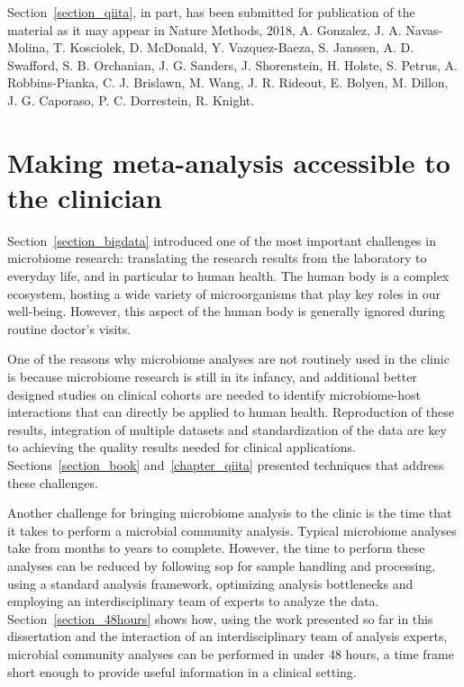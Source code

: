 \documentclass[12pt,chapterheads]{ucsd}
\begin{document}
Section~\ref{section_qiita}, in part, has been submitted for publication of the
material as it may appear in Nature Methods, 2018, A. Gonzalez, J. A. Navas-Molina,
T. Kosciolek, D. McDonald, Y. Vazquez-Baeza, S. Janssen, A. D. Swafford, S. B. Orchanian,
J. G. Sanders, J. Shorenstein, H. Holste, S. Petrus, A. Robbins-Pianka, C. J. Brislawn,
M. Wang, J. R. Rideout, E. Bolyen, M. Dillon, J. G. Caporaso, P. C. Dorrestein, R. Knight.



\chapter{Making meta-analysis accessible to the clinician}\label{chapter_rapid_response}
\glsresetall

Section~\ref{section_bigdata} introduced one of the most important challenges in
microbiome research: translating the research results from the laboratory to
everyday life, and in particular to human health. The human body is a complex ecosystem,
hosting a wide variety of microorganisms that play key roles in our well-being.
However, this aspect of the human body is generally ignored during routine
doctor's visits.

One of the reasons why microbiome analyses are not routinely used in the clinic
is because microbiome research is still in its infancy, and additional better designed
studies on clinical cohorts are needed to identify microbiome-host interactions
that can directly be applied to human health. Reproduction of these results,
integration of multiple datasets and standardization of the data are key to achieving
the quality results needed for clinical applications. Sections~\ref{section_book}
and~\ref{chapter_qiita} presented techniques that address these challenges.

Another challenge for bringing microbiome analysis to the clinic is the time that
it takes to perform a microbial community analysis. Typical microbiome
analyses take from months to years to complete. However, the time to
perform these analyses can be reduced by following \gls{sop} for sample handling
and processing, using a standard analysis framework, optimizing analysis
bottlenecks and employing an interdisciplinary team of experts to analyze the data.
Section~\ref{section_48hours} shows how, using the work presented so far in this
dissertation and the interaction of an interdisciplinary team of analysis experts,
microbial community analyses can be performed in under 48 hours, a time frame short
enough to provide useful information in a clinical setting.
\end{document}
